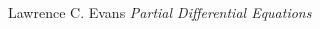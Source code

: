 %
%
%
%
%
%
%
%

\begin{thebibliography}{9}

Lawrence C. Evans
\textit{Partial Differential Equations}

\end{thebibliography}

